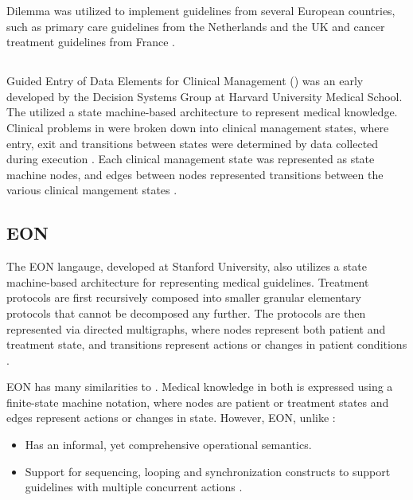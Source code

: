 Dilemma was utilized to implement guidelines from several European
countries, such as primary care guidelines from the Netherlands and the UK and cancer
treatment guidelines from France \cite{HerbertMPB95}.

\subsection{\GEODECM{}}\label{sec:geodecm}

Guided Entry of Data Elements for Clinical Management (\GEODECM{}) was
an early \DSL{} developed by the Decision Systems Group at Harvard University
Medical School. The \GEODECM{} \DSL{} utilized a
state machine-based architecture to represent medical knowledge.
Clinical problems in \GEODECM{} were broken down into clinical management
states, where entry, exit and transitions between states were determined
by data collected during execution \cite{StoufletJAMIA96}. Each
clinical management state was represented as state machine nodes,
and edges between nodes represented transitions between the various clinical
mangement states \cite{MachadoJAMIA98}.

\subsection{EON}\label{sec:eon}

The EON langauge, developed at Stanford University, also
utilizes a state machine-based architecture for representing medical guidelines.
Treatment protocols are first recursively composed into smaller granular
elementary protocols that cannot be decomposed any further.
The protocols are then represented via directed multigraphs, where
nodes represent both patient and treatment state, and transitions represent
actions or changes in patient conditions \cite{TuAMIA96}.

EON{} has many similarities to \GEODECM{}. Medical knowledge in both \DSLs{}
is expressed using a finite-state machine notation, where nodes are
patient or treatment states and edges represent actions or changes in state.
However, EON, unlike \GEODECM{}:
\begin{itemize}
  \item Has an informal, yet comprehensive operational semantics.
  \item Support for sequencing, looping and synchronization constructs to support
    guidelines with multiple concurrent actions \cite{TuAMIA96}.
\end{itemize}

